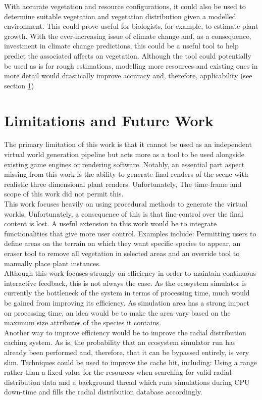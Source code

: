 With accurate vegetation and resource configurations, it could also be used to determine suitable vegetation and vegetation distribution given a modelled environment. This could prove useful for biologists, for example, to estimate plant growth. With the ever-increasing issue of climate change and, as a consequence, investment in climate change predictions, this could be a useful tool to help predict the associated affects on vegetation. Although the tool could potentially be used as is for rough estimations, modelling more resources and existing ones in more detail would drastically improve accuracy and, therefore, applicability (see section \ref{sec:future_work})\\

\section{Limitations and Future Work} \label{sec:future_work}

The primary limitation of this work is that it cannot be used as an independent virtual world generation pipeline but acts more as a tool to be used alongside existing game engines or rendering software. Notably, an essential part aspect missing from this work is the ability to generate final renders of the scene with realistic three dimensional plant renders. Unfortunately, The time-frame and scope of this work did not permit this.\\

This work focuses heavily on using procedural methods to generate the virtual worlds. Unfortunately, a consequence of this is that fine-control over the final content is lost. A useful extension to this work would be to integrate functionalities that give more user control. Examples include: Permitting users to define areas on the terrain on which they want specific species to appear, an eraser tool to remove all vegetation in selected areas and an override tool to manually place plant instances.\\

Although this work focuses strongly on efficiency in order to maintain continuous interactive feedback, this is not always the case. As the ecosystem simulator is currently the bottleneck of the system in terms of processing time, much would be gained from improving its efficiency. As simulation area has a strong impact on processing time, an idea would be to make the area vary based on the maximum size attributes of the species it contains. \\
Another way to improve efficiency would be to improve the radial distribution caching system. As is, the probability that an ecosystem simulator run has already been performed and, therefore, that it can be bypassed entirely, is very slim. Techniques could be used to improve the cache hit, including: Using a range rather than a fixed value for the resources when searching for valid radial distribution data and a background thread which runs simulations during CPU down-time and fills the radial distribution database accordingly.\\

